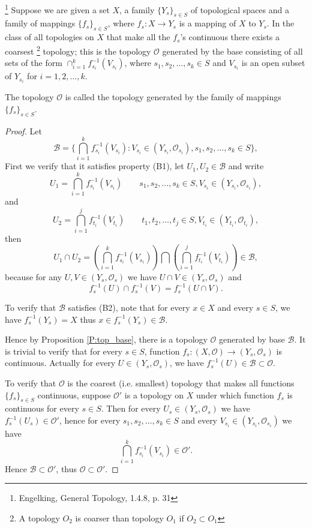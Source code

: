 \begin{proposition} \label{P:top_fun}
\footnote{Engelking, General Topology, 1.4.8, p. 31}
Suppose we are given a set $X$, a family $\{Y_s\}_{s\in S}$ of topological
spaces and a family of mappings $\{f_s\}_{s\in S}$, where $f_s:X\to Y_s$ is
a mapping of $X$ to $Y_s$. In the class of all topologies on $X$ that make 
all the $f_s$'s continuous there exists a coarsest 
\footnote{A topology $O_2$ is coarser than topology $O_1$ if $O_2\subset O_1$}
topology; this is the 
topology $\mathcal{O}$ generated by the base consisting of all sets of the
form $\cap^k_{i=1} f^{-1}_{s_i}(V_{s_i})$, where $s_1,s_2,\dots,s_k\in S$
and $V_{s_i}$ is an open subset of $Y_{s_i}$ for $i=1,2,\dots,k$.

The topology $\mathcal{O}$ is called the topology generated by the family
of mappings $\{f_s\}_{s\in S}$. 
\end{proposition}
\begin{proof}
Let 
\[
  \mathcal{B} = \{ \bigcap^k_{i=1} f^{-1}_{s_i}(V_{s_i}): 
                   V_{s_i}\in (Y_{s_i},\mathcal{O}_{s_i}),
                   s_1,s_2,\dots,s_k\in S 
                \},
\]
First we verify that it satisfies property (B1), let $U_1,U_2\in\mathcal{B}$ 
and write
\[
  U_1 = \bigcap^k_{i=1} f^{-1}_{s_i}(V_{s_i}) 
        \qquad s_1,s_2,\dots,s_k\in S, V_{s_i}\in (Y_{s_i},\mathcal{O}_{s_i}),
\]
and
\[
  U_2 = \bigcap^j_{i=1} f^{-1}_{t_i}(V_{t_i}) 
        \qquad t_1,t_2,\dots,t_j\in S, V_{t_i}\in (Y_{t_i},\mathcal{O}_{t_i}),
\]
then
\[
  U_1\cap U_2 = \left(  \bigcap^k_{i=1} f^{-1}_{s_i}(V_{s_i}) \right)
               \bigcap \left( \bigcap^j_{i=1} f^{-1}_{t_i}(V_{t_i}) \right) 
    \in \mathcal{B},
\]
because for any $U,V\in (Y_s,\mathcal{O}_s)$ we have 
$U\cap V\in (Y_s,\mathcal{O}_s)$ and
\[
  f_s^{-1}(U) \cap f_s^{-1}(V) = f_s^{-1}(U\cap V).
\]

To verify that $\mathcal{B}$ satisfies (B2), note that for every $x\in X$ and 
every $s\in S$, we have $f_s^{-1}(Y_s)=X$ thus 
$x\in f_s^{-1}(Y_s)\in\mathcal{B}$.

Hence by Proposition \ref{P:top_base}, there is a topology $\mathcal{O}$ 
generated by base $\mathcal{B}$. It is trivial to verify that for every 
$s\in S$, function $f_s:(X,\mathcal{O})\to (Y_s,\mathcal{O}_s)$ is continuous.
Actually for every $U\in (Y_s,\mathcal{O}_s)$, we have 
$f_s^{-1}(U)\in \mathcal{B}\subset \mathcal{O}$.

To verify that $\mathcal{O}$ is the coarest (i.e. smallest) topology that makes
all functions $\{f_s\}_{s\in S}$ continuous, suppose $\mathcal{O}'$ is a 
topology on $X$ under which function $f_s$ is continuous for every $s\in S$. 
Then for every $U_s\in (Y_s,\mathcal{O}_s)$ we have 
$f_s^{-1}(U_s)\in \mathcal{O}'$, hence for every $s_1,s_2,\dots,s_k\in S$ and 
every $V_{s_i}\in (Y_{s_i},\mathcal{O}_{s_i})$ we have
\[
  \bigcap_{i=1}^k f^{-1}_{s_i}(V_{s_i})\in\mathcal{O}'.
\]
Hence $\mathcal{B}\subset\mathcal{O}'$, thus $\mathcal{O}\subset\mathcal{O}'$.
\end{proof}

